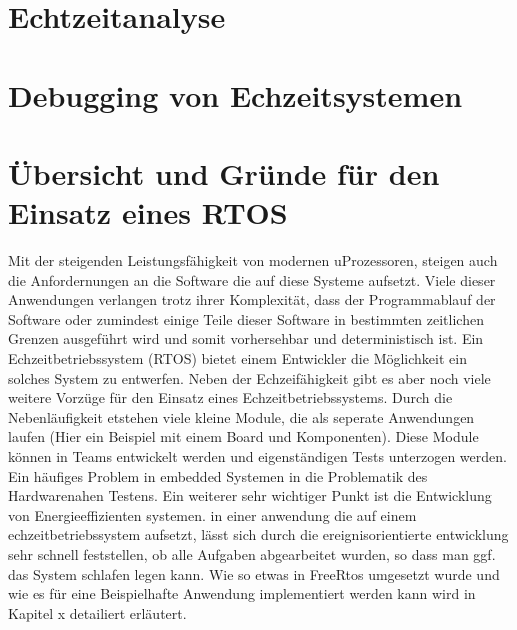 \documentclass[ngerman]{seminarvorlage}
\begin{document}
\section{Echtzeitanalyse} 
\section{Debugging von Echzeitsystemen} 


\section{Übersicht und Gründe für den Einsatz eines RTOS}
Mit der steigenden Leistungsfähigkeit von modernen uProzessoren, steigen auch die Anfordernungen an die Software die auf diese Systeme aufsetzt.
Viele dieser Anwendungen verlangen trotz ihrer Komplexität, dass der Programmablauf der Software oder zumindest einige Teile dieser Software in bestimmten zeitlichen Grenzen ausgeführt wird und somit vorhersehbar und deterministisch ist.
Ein Echzeitbetriebssystem (RTOS) bietet einem Entwickler die Möglichkeit ein solches System zu entwerfen. Neben der Echzeifähigkeit gibt es aber noch viele weitere Vorzüge für den Einsatz eines Echzeitbetriebssystems. Durch die Nebenläufigkeit etstehen viele kleine Module, die als seperate Anwendungen laufen (Hier ein Beispiel mit einem Board und Komponenten). Diese Module können in Teams entwickelt werden und eigenständigen Tests unterzogen werden. Ein häufiges Problem in embedded Systemen in die Problematik des Hardwarenahen Testens. Ein weiterer sehr wichtiger Punkt ist die Entwicklung von Energieeffizienten systemen. in einer anwendung die auf einem echzeitbetriebssystem aufsetzt, lässt sich durch die ereignisorientierte entwicklung sehr schnell feststellen, ob alle Aufgaben abgearbeitet wurden, so dass man ggf. das System schlafen legen kann. Wie so etwas in FreeRtos umgesetzt wurde und wie es für eine Beispielhafte Anwendung implementiert werden kann wird in Kapitel x detailiert erläutert.  
\end{document}
